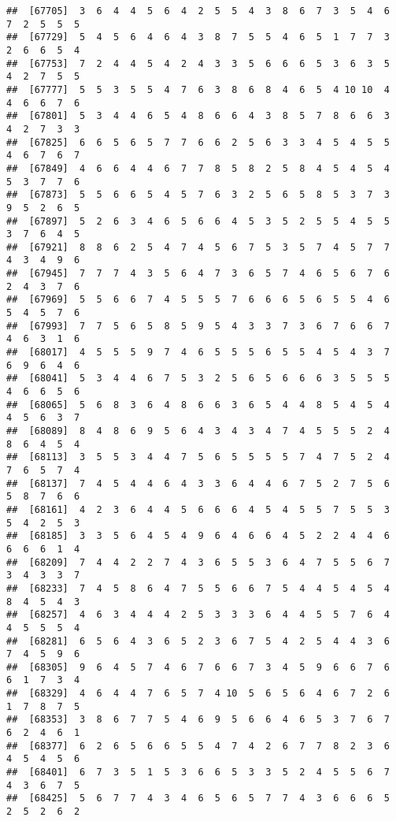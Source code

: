 \documentclass[
]{book}
\begin{document}
\begin{verbatim}
##  [67705]  3  6  4  4  5  6  4  2  5  5  4  3  8  6  7  3  5  4  6  7  2  5  5  5
##  [67729]  5  4  5  6  4  6  4  3  8  7  5  5  4  6  5  1  7  7  3  2  6  6  5  4
##  [67753]  7  2  4  4  5  4  2  4  3  3  5  6  6  6  5  3  6  3  5  4  2  7  5  5
##  [67777]  5  5  3  5  5  4  7  6  3  8  6  8  4  6  5  4 10 10  4  4  6  6  7  6
##  [67801]  5  3  4  4  6  5  4  8  6  6  4  3  8  5  7  8  6  6  3  4  2  7  3  3
##  [67825]  6  6  5  6  5  7  7  6  6  2  5  6  3  3  4  5  4  5  5  4  6  7  6  7
##  [67849]  4  6  6  4  4  6  7  7  8  5  8  2  5  8  4  5  4  5  4  5  3  7  7  6
##  [67873]  5  5  6  6  5  4  5  7  6  3  2  5  6  5  8  5  3  7  3  9  5  2  6  5
##  [67897]  5  2  6  3  4  6  5  6  6  4  5  3  5  2  5  5  4  5  5  3  7  6  4  5
##  [67921]  8  8  6  2  5  4  7  4  5  6  7  5  3  5  7  4  5  7  7  4  3  4  9  6
##  [67945]  7  7  7  4  3  5  6  4  7  3  6  5  7  4  6  5  6  7  6  2  4  3  7  6
##  [67969]  5  5  6  6  7  4  5  5  5  7  6  6  6  5  6  5  5  4  6  5  4  5  7  6
##  [67993]  7  7  5  6  5  8  5  9  5  4  3  3  7  3  6  7  6  6  7  4  6  3  1  6
##  [68017]  4  5  5  5  9  7  4  6  5  5  5  6  5  5  4  5  4  3  7  6  9  6  4  6
##  [68041]  5  3  4  4  6  7  5  3  2  5  6  5  6  6  6  3  5  5  5  4  6  6  5  6
##  [68065]  5  6  8  3  6  4  8  6  6  3  6  5  4  4  8  5  4  5  4  4  5  6  3  7
##  [68089]  8  4  8  6  9  5  6  4  3  4  3  4  7  4  5  5  5  2  4  8  6  4  5  4
##  [68113]  3  5  5  3  4  4  7  5  6  5  5  5  5  7  4  7  5  2  4  7  6  5  7  4
##  [68137]  7  4  5  4  4  6  4  3  3  6  4  4  6  7  5  2  7  5  6  5  8  7  6  6
##  [68161]  4  2  3  6  4  4  5  6  6  6  4  5  4  5  5  7  5  5  3  5  4  2  5  3
##  [68185]  3  3  5  6  4  5  4  9  6  4  6  6  4  5  2  2  4  4  6  6  6  6  1  4
##  [68209]  7  4  4  2  2  7  4  3  6  5  5  3  6  4  7  5  5  6  7  3  4  3  3  7
##  [68233]  7  4  5  8  6  4  7  5  5  6  6  7  5  4  4  5  4  5  4  8  4  5  4  3
##  [68257]  4  6  3  4  4  4  2  5  3  3  3  6  4  4  5  5  7  6  4  4  5  5  5  4
##  [68281]  6  5  6  4  3  6  5  2  3  6  7  5  4  2  5  4  4  3  6  7  4  5  9  6
##  [68305]  9  6  4  5  7  4  6  7  6  6  7  3  4  5  9  6  6  7  6  6  1  7  3  4
##  [68329]  4  6  4  4  7  6  5  7  4 10  5  6  5  6  4  6  7  2  6  1  7  8  7  5
##  [68353]  3  8  6  7  7  5  4  6  9  5  6  6  4  6  5  3  7  6  7  6  2  4  6  1
##  [68377]  6  2  6  5  6  6  5  5  4  7  4  2  6  7  7  8  2  3  6  4  5  4  5  6
##  [68401]  6  7  3  5  1  5  3  6  6  5  3  3  5  2  4  5  5  6  7  4  3  6  7  5
##  [68425]  5  6  7  7  4  3  4  6  5  6  5  7  7  4  3  6  6  6  5  2  5  2  6  2

\end{verbatim}
\end{document}

